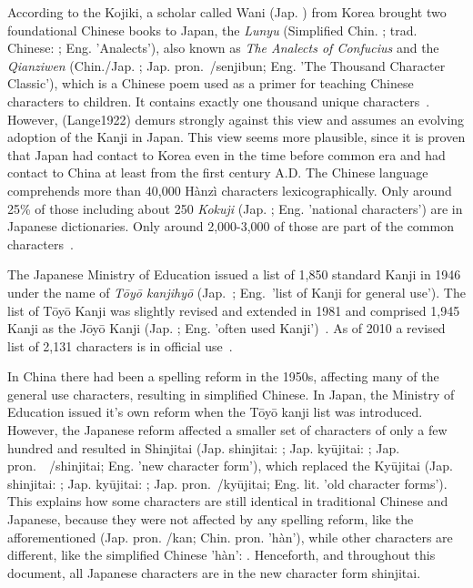 According to the Kojiki, a scholar called Wani (Jap. ) from Korea 
brought two foundational Chinese books to Japan, the \emph{Lunyu} 
(Simplified Chin. ; trad. Chinese: ; Eng. 'Analects'), 
also known as \emph{The Analects of Confucius} and 
the \emph{Qianziwen} (Chin./Jap. ; Jap. 
pron.~/senjibun; Eng. 'The Thousand Character Classic'),
which is a Chinese poem used as a primer for teaching Chinese characters to 
children. It contains exactly one thousand unique 
characters~. However, \shortcite(Lange1922) demurs 
strongly against this view and assumes an evolving adoption of the Kanji in
Japan. This view seems more plausible, since it is proven that Japan had contact 
to Korea even in the time before common era and had contact to China at least 
from the first century A.D. The Chinese language comprehends more 
than 40,000 Hànzì characters lexicographically. Only around 25\% of those 
including about 250 \emph{Kokuji} (Jap. ; Eng. 'national characters') 
are in Japanese dictionaries. Only around 2,000-3,000 of those are part of the 
common characters~. 

The Japanese Ministry of Education issued a list of 1,850 standard Kanji in 1946
under the name of \emph{Tōyō kanjihyō} (Jap.~;
Eng.~'list of Kanji for general use'). The list of Tōyō Kanji was slightly 
revised and extended in 1981 and comprised 1,945 Kanji as the Jōyō Kanji
(Jap. ; Eng. 'often used Kanji')~.
As of 2010 a revised list of 2,131 characters is in official 
use~. 

In China there had been a spelling reform in the 1950s, affecting many of the
general use characters, resulting in simplified Chinese. In Japan, the Ministry
of Education issued it's own reform when the Tōyō kanji list was introduced.
However, the Japanese reform affected a smaller set of characters of only a few 
hundred and resulted in Shinjitai (Jap. shinjitai: ; 
Jap. kyūjitai: ;
Jap. pron.　/shinjitai; Eng. 'new character form'), 
which replaced the Kyūjitai 
(Jap. shinjitai: ; Jap. kyūjitai: ; 
Jap. pron.~/kyūjitai; Eng. lit. 'old character forms'). 
This explains how some characters are still identical in traditional Chinese and 
Japanese, because they were not affected by any spelling reform, like the 
afforementioned  (Jap. pron. /kan; Chin. pron. 'hàn'),
while other characters are different, like the simplified 
Chinese 'hàn': . Henceforth, and throughout this document, all Japanese characters are in the new character form shinjitai.

